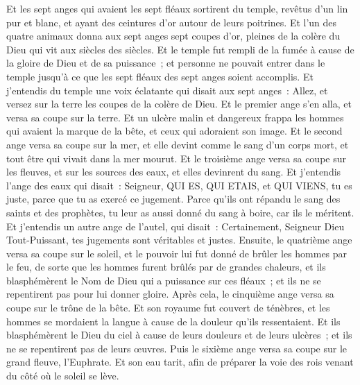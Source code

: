 \begin{multicols}{2}
Et les sept anges qui avaient les sept fléaux sortirent du temple, revêtus d'un lin pur et blanc, et ayant des ceintures d'or autour de leurs poitrines.
Et l'un des quatre animaux donna aux sept anges sept coupes d'or, pleines de la colère du Dieu qui vit aux siècles des siècles.
Et le temple fut rempli de la fumée à cause de la gloire de Dieu et de sa puissance~; et personne ne pouvait entrer dans le temple jusqu'à ce que les sept fléaux des sept anges soient accomplis.
\VerseOne{}Et j'entendis du temple une voix éclatante qui disait aux sept anges~: Allez, et versez sur la terre les coupes de la colère de Dieu.
Et le premier ange s'en alla, et versa sa coupe sur la terre. Et un ulcère malin et dangereux frappa les hommes qui avaient la marque de la bête, et ceux qui adoraient son image.
Et le second ange versa sa coupe sur la mer, et elle devint comme le sang d'un corps mort, et tout être qui vivait dans la mer mourut.
Et le troisième ange versa sa coupe sur les fleuves, et sur les sources des eaux, et elles devinrent du sang.
Et j'entendis l'ange des eaux qui disait~: Seigneur, QUI ES, QUI ETAIS, et QUI VIENS, tu es juste, parce que tu as exercé ce jugement.
Parce qu'ils ont répandu le sang des saints et des prophètes, tu leur as aussi donné du sang à boire, car ils le méritent.
Et j'entendis un autre ange de l'autel, qui disait~: Certainement, Seigneur Dieu Tout-Puissant, tes jugements sont véritables et justes.
Ensuite, le quatrième ange versa sa coupe sur le soleil, et le pouvoir lui fut donné de brûler les hommes par le feu,
de sorte que les hommes furent brûlés par de grandes chaleurs, et ils blasphémèrent le Nom de Dieu qui a puissance sur ces fléaux~; et ils ne se repentirent pas pour lui donner gloire.
Après cela, le cinquième ange versa sa coupe sur le trône de la bête. Et son royaume fut couvert de ténèbres, et les hommes se mordaient la langue à cause de la douleur qu'ils ressentaient.
Et ils blasphémèrent le Dieu du ciel à cause de leurs douleurs et de leurs ulcères~; et ils ne se repentirent pas de leurs œuvres.
Puis le sixième ange versa sa coupe sur le grand fleuve, l'Euphrate. Et son eau tarit, afin de préparer la voie des rois venant du côté où le soleil se lève.

\end{multicols}

